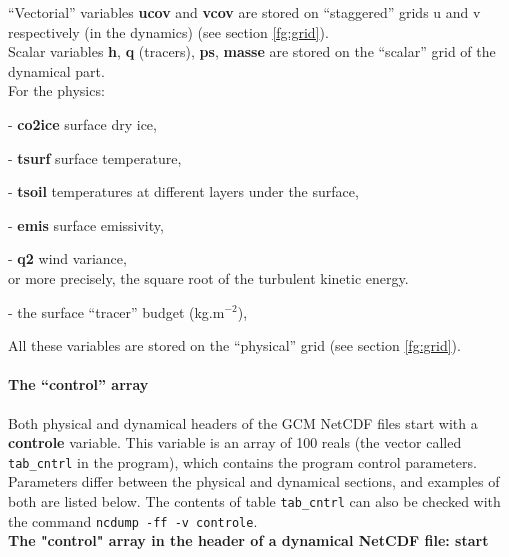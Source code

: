 \noindent
``Vectorial'' variables {\bf ucov} and {\bf vcov} are stored on
``staggered'' grids u and v respectively (in the dynamics)
(see section \ref{fg:grid}).\\
Scalar variables {\bf h}, {\bf q} (tracers), {\bf ps}, {\bf masse} are stored
on the ``scalar'' grid of the dynamical part.\\

\noindent
For the physics:
\begin{description}
\item - {\bf co2ice} surface dry ice,
\item - {\bf tsurf} surface temperature,
\item - {\bf tsoil} temperatures at different layers under the surface,
\item - {\bf emis} surface emissivity,
\item - {\bf q2} wind variance,\\
or more precisely, the square root of the turbulent kinetic energy.
\item - the surface ``tracer'' budget
 (kg.m$^{-2}$),\\
\end{description}

\noindent
All these variables are stored on the ``physical'' grid
(see section \ref{fg:grid}).\\

\paragraph{The ``control'' array}

\indent
Both physical and dynamical headers of the GCM NetCDF files start with
a {\bf controle} variable. This variable is an array of 100 reals (the vector
called {\tt tab\_cntrl} in the program), which contains the program control
parameters.
Parameters differ between the physical and dynamical sections, and examples
of both are listed below. The contents of table {\tt tab\_cntrl} can also
be checked with the command {\tt ncdump -ff -v controle}.\\

\noindent
{\bf The "control" array in the header of a dynamical NetCDF file:
start}


